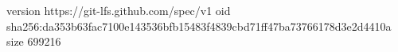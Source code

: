 version https://git-lfs.github.com/spec/v1
oid sha256:da353b63fac7100e143536bfb15483f4839cbd71ff47ba73766178d3e2d4410a
size 699216
